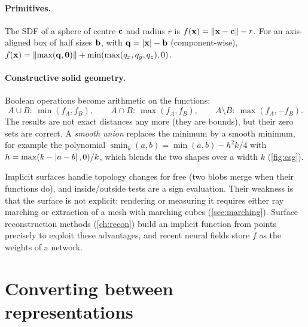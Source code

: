 \paragraph{Primitives.} The SDF of a sphere of centre $\mathbf{c}$ and radius $r$ is
$f(\mathbf{x})=\left\lVert \mathbf{x}-\mathbf{c}\right\rVert-r$. For an axis-aligned box of half sizes $\mathbf{b}$, with
$\mathbf{q}=\left\lvert \mathbf{x}\right\rvert-\mathbf{b}$ (component-wise),
$f(\mathbf{x})=\left\lVert \max(\mathbf{q},\mathbf{0})\right\rVert+\min(\max(q_x,q_y,q_z),0)$.

\paragraph{Constructive solid geometry.} Boolean operations become arithmetic on the functions:
\begin{equation}
A\cup B:\ \min(f_A,f_B),\qquad A\cap B:\ \max(f_A,f_B),\qquad A\setminus B:\ \max(f_A,-f_B).
\end{equation}
The results are not exact distances any more (they are bounds), but their zero sets are correct. A
\emph{smooth union} replaces the minimum by a smooth minimum, for example the polynomial
$\operatorname{smin}_k(a,b)=\min(a,b)-h^2k/4$ with $h=\max(k-\left\lvert a-b\right\rvert,0)/k$, which blends the
two shapes over a width $k$ (\cref{fig:csg}).


Implicit surfaces handle topology changes for free (two blobs merge when their functions do), and
inside/outside tests are a sign evaluation. Their weakness is that the surface is not explicit:
rendering or measuring it requires either ray marching or extraction of a mesh with marching cubes
(\cref{sec:marching}). Surface reconstruction methods (\cref{ch:recon}) build an implicit function
from points precisely to exploit these advantages, and recent neural fields store $f$ as the
weights of a network.

\section{Converting between representations}

